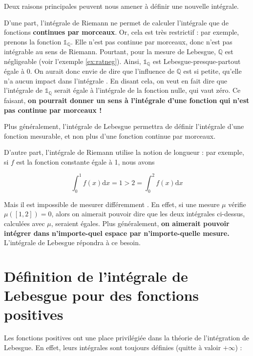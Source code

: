 \documentclass[french]{report}
\theoremstyle{plain}
\theoremstyle{definition}
\theoremstyle{remark}
\begin{document}
Deux raisons principales peuvent nous amener à définir une nouvelle intégrale.

D'une part, l'intégrale de Riemann ne permet de calculer l'intégrale que de fonctions \textbf{continues par morceaux}.
Or, cela est très restrictif : par exemple, prenons la fonction $\mathds{1}_{\mathbb{Q}}$.
Elle n'est pas continue par morceaux, donc n'est pas intégrable au sens de Riemann.
Pourtant, pour la mesure de Lebesgue, $\mathbb{Q}$ est négligeable (voir l'exemple \ref{ex:ratneg}).
Ainsi, $\mathds{1}_{\mathbb{Q}}$ est Lebesgue-presque-partout égale à $0$.
On aurait donc envie de dire que \og l'influence de $\mathbb{Q}$ est si petite, qu'elle n'a aucun impact dans l'intégrale \fg.
En disant cela, on veut en fait dire que l'intégrale de $\mathds{1}_{\mathbb{Q}}$ serait égale à l'intégrale de la fonction nulle, qui vaut zéro.
Ce faisant, \textbf{on pourrait donner un sens à l'intégrale d'une fonction qui n'est pas continue par morceaux !}

Plus généralement, l'intégrale de Lebesgue permettra de définir l'intégrale d'une fonction mesurable, et non plus d'une fonction continue par morceaux.

D'autre part, l'intégrale de Riemann utilise la notion de longueur :
par exemple, si $f$ est la fonction constante égale à 1, nous avons

$$
\int_0^1f(x)\text{d}x = 1 > 2 = \int_0^2f(x)\text{d}x
$$

Mais il est impossible de \og mesurer différemment \fg.
En effet, si une mesure $\mu$ vérifie $\mu\left(\left[1,2\right]\right)=0$, alors on aimerait pouvoir dire que les deux intégrales ci-dessus, calculées avec $\mu$, seraient égales.
Plus généralement, \textbf{on aimerait pouvoir intégrer dans n'importe-quel espace par n'importe-quelle mesure.}
L'intégrale de Lebesgue répondra à ce besoin.

\section{Définition de l'intégrale de Lebesgue pour des fonctions positives}
\label{sect:defintpos}
Les fonctions positives ont une place privilégiée dans la théorie de l'intégration de Lebesgue.
En effet, leurs intégrales sont toujours définies (quitte à valoir $+\infty$) :
\end{document}
